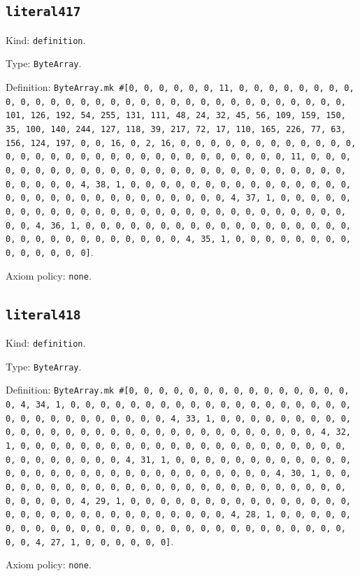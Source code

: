 \documentclass[11pt]{article}
\begin{document}
\subsection*{\texttt{literal417}}
\noindent Kind: \texttt{definition}.\par
\noindent Type: \texttt{ByteArray}.\par
\noindent Definition: \texttt{ByteArray.mk \#[0, 0, 0, 0, 0, 0, 11, 0, 0, 0, 0, 0, 0, 0, 0, 0, 0, 0, 0, 0, 0, 0, 0, 0, 0, 0, 0, 0, 0, 0, 0, 0, 0, 0, 0, 0, 0, 0, 101, 126, 192, 54, 255, 131, 111, 48, 24, 32, 45, 56, 109, 159, 150, 35, 100, 140, 244, 127, 118, 39, 217, 72, 17, 110, 165, 226, 77, 63, 156, 124, 197, 0, 0, 16, 0, 2, 16, 0, 0, 0, 0, 0, 0, 0, 0, 0, 0, 0, 0, 0, 0, 0, 0, 0, 0, 0, 0, 0, 0, 0, 0, 0, 0, 0, 0, 0, 0, 0, 11, 0, 0, 0, 0, 0, 0, 0, 0, 0, 0, 0, 0, 0, 0, 0, 0, 0, 0, 0, 0, 0, 0, 0, 0, 0, 0, 0, 0, 0, 0, 0, 4, 38, 1, 0, 0, 0, 0, 0, 0, 0, 0, 0, 0, 0, 0, 0, 0, 0, 0, 0, 0, 0, 0, 0, 0, 0, 0, 0, 0, 0, 0, 0, 0, 4, 37, 1, 0, 0, 0, 0, 0, 0, 0, 0, 0, 0, 0, 0, 0, 0, 0, 0, 0, 0, 0, 0, 0, 0, 0, 0, 0, 0, 0, 0, 0, 0, 4, 36, 1, 0, 0, 0, 0, 0, 0, 0, 0, 0, 0, 0, 0, 0, 0, 0, 0, 0, 0, 0, 0, 0, 0, 0, 0, 0, 0, 0, 0, 0, 0, 4, 35, 1, 0, 0, 0, 0, 0, 0, 0, 0, 0, 0, 0, 0, 0, 0]}.\par
\noindent Axiom policy: \texttt{none}.\par
\subsection*{\texttt{literal418}}
\noindent Kind: \texttt{definition}.\par
\noindent Type: \texttt{ByteArray}.\par
\noindent Definition: \texttt{ByteArray.mk \#[0, 0, 0, 0, 0, 0, 0, 0, 0, 0, 0, 0, 0, 0, 0, 0, 4, 34, 1, 0, 0, 0, 0, 0, 0, 0, 0, 0, 0, 0, 0, 0, 0, 0, 0, 0, 0, 0, 0, 0, 0, 0, 0, 0, 0, 0, 0, 0, 0, 4, 33, 1, 0, 0, 0, 0, 0, 0, 0, 0, 0, 0, 0, 0, 0, 0, 0, 0, 0, 0, 0, 0, 0, 0, 0, 0, 0, 0, 0, 0, 0, 0, 4, 32, 1, 0, 0, 0, 0, 0, 0, 0, 0, 0, 0, 0, 0, 0, 0, 0, 0, 0, 0, 0, 0, 0, 0, 0, 0, 0, 0, 0, 0, 0, 0, 4, 31, 1, 0, 0, 0, 0, 0, 0, 0, 0, 0, 0, 0, 0, 0, 0, 0, 0, 0, 0, 0, 0, 0, 0, 0, 0, 0, 0, 0, 0, 0, 0, 4, 30, 1, 0, 0, 0, 0, 0, 0, 0, 0, 0, 0, 0, 0, 0, 0, 0, 0, 0, 0, 0, 0, 0, 0, 0, 0, 0, 0, 0, 0, 0, 0, 4, 29, 1, 0, 0, 0, 0, 0, 0, 0, 0, 0, 0, 0, 0, 0, 0, 0, 0, 0, 0, 0, 0, 0, 0, 0, 0, 0, 0, 0, 0, 0, 0, 4, 28, 1, 0, 0, 0, 0, 0, 0, 0, 0, 0, 0, 0, 0, 0, 0, 0, 0, 0, 0, 0, 0, 0, 0, 0, 0, 0, 0, 0, 0, 0, 0, 4, 27, 1, 0, 0, 0, 0, 0, 0]}.\par
\noindent Axiom policy: \texttt{none}.\par
\end{document}
